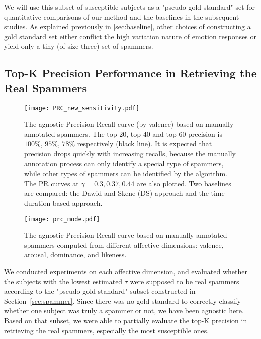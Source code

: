 \documentclass[10pt,journal,letterpaper,compsoc,twoside]{IEEEtran}
\begin{document}
{
We will use this subset of susceptible subjects as a "pseudo-gold standard" set for quantitative comparisons of our method and the baselines in the subsequent studies. As explained previously in \ref{sec:baseline}, other choices of constructing a gold standard set either conflict the high variation nature of emotion responses or yield only a tiny (of size three) set of spammers.   
}

\subsection{Top-K Precision Performance in Retrieving the Real Spammers}
\begin{figure}[htp]
\texttt{[image: PRC\_new\_sensitivity.pdf]}
\caption{The agnostic Precision-Recall curve (by valence) 
based on manually annotated spammers. 
The top 20, top 40 and top 60 precision is 
$100\%$, $95\%$, $78\%$ respectively (black line). 
It is expected that precision drops quickly with increasing recalls,
because the manually annotation process can only identify 
a special type of spammers, while other types of spammers can be identified
by the algorithm. The PR curves at $\gamma=0.3,0.37,0.44$ are also plotted.
{Two baselines are compared: the Dawid and Skene (DS) approach
and the time duration based approach.}}
\label{fig:prc}
\end{figure}
\begin{figure}[htp]
\texttt{[image: prc\_mode.pdf]}
\caption{The agnostic Precision-Recall curve based on manually annotated spammers
computed from different affective dimensions: valence, arousal, dominance, and likeness.}
\label{fig:prc2}
\end{figure}
We conducted experiments on each affective dimension, and evaluated
whether the subjects with the lowest estimated $\tau$ were supposed to be real spammers {according to the "pseudo-gold standard" subset constructed in Section~\ref{sec:spammer}. }
Since there was no gold standard to correctly classify whether one subject
was truly a spammer or not, we have been agnostic here. 
Based on that subset, we were able to partially evaluate the top-K precision in retrieving the real spammers, especially the most susceptible ones. 
\end{document}
